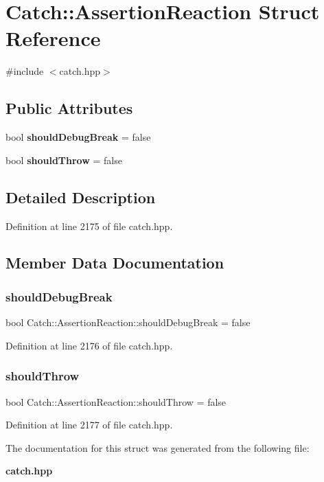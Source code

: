 \section{Catch\+::Assertion\+Reaction Struct Reference}
\label{struct_catch_1_1_assertion_reaction}


{\ttfamily \#include $<$catch.\+hpp$>$}

\subsection*{Public Attributes}
\begin{DoxyCompactItemize}
\item 
bool \textbf{ should\+Debug\+Break} = false
\item 
bool \textbf{ should\+Throw} = false
\end{DoxyCompactItemize}


\subsection{Detailed Description}


Definition at line 2175 of file catch.\+hpp.



\subsection{Member Data Documentation}
\mbox{\label{struct_catch_1_1_assertion_reaction_adcf30fb90ff20d9789df78d424652497}} 
\subsubsection{shouldDebugBreak}
{\footnotesize\ttfamily bool Catch\+::\+Assertion\+Reaction\+::should\+Debug\+Break = false}



Definition at line 2176 of file catch.\+hpp.

\mbox{\label{struct_catch_1_1_assertion_reaction_a82c8d95a2c1b6a331bde66982a8e090f}} 
\subsubsection{shouldThrow}
{\footnotesize\ttfamily bool Catch\+::\+Assertion\+Reaction\+::should\+Throw = false}



Definition at line 2177 of file catch.\+hpp.



The documentation for this struct was generated from the following file\+:\begin{DoxyCompactItemize}
\item 
\textbf{ catch.\+hpp}\end{DoxyCompactItemize}
